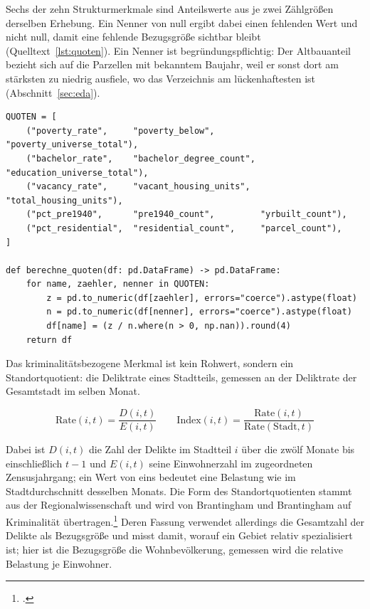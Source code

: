 Sechs der zehn Strukturmerkmale sind Anteilswerte aus je zwei Zählgrößen
derselben Erhebung. Ein Nenner von null ergibt dabei einen fehlenden Wert und
nicht null, damit eine fehlende Bezugsgröße sichtbar bleibt
(Quelltext~\ref{lst:quoten}). Ein Nenner ist begründungspflichtig: Der
Altbauanteil bezieht sich auf die Parzellen mit bekanntem Baujahr, weil er
sonst dort am stärksten zu niedrig ausfiele, wo das Verzeichnis am
lückenhaftesten ist (Abschnitt~\ref{sec:eda}).

\begin{lstlisting}[style=pythonstil,
  label={lst:quoten},
  caption={Anteilswerte aus Zählvariablen
           (\texttt{prep/s1\_daten.py}, Z.~559--584, gekürzt)}]
QUOTEN = [
    ("poverty_rate",     "poverty_below",         "poverty_universe_total"),
    ("bachelor_rate",    "bachelor_degree_count", "education_universe_total"),
    ("vacancy_rate",     "vacant_housing_units",  "total_housing_units"),
    ("pct_pre1940",      "pre1940_count",         "yrbuilt_count"),
    ("pct_residential",  "residential_count",     "parcel_count"),
]

def berechne_quoten(df: pd.DataFrame) -> pd.DataFrame:
    for name, zaehler, nenner in QUOTEN:
        z = pd.to_numeric(df[zaehler], errors="coerce").astype(float)
        n = pd.to_numeric(df[nenner], errors="coerce").astype(float)
        df[name] = (z / n.where(n > 0, np.nan)).round(4)
    return df
\end{lstlisting}

Das kriminalitätsbezogene Merkmal ist kein Rohwert, sondern ein
Standortquotient: die Deliktrate eines Stadtteils, gemessen an der Deliktrate
der Gesamtstadt im selben Monat.

\begin{equation*}
    \mathrm{Rate}(i,t) = \frac{D(i,t)}{E(i,t)}
    \qquad
    \mathrm{Index}(i,t) = \frac{\mathrm{Rate}(i,t)}{\mathrm{Rate}(\mathrm{Stadt},t)}
\end{equation*}

Dabei ist $D(i,t)$ die Zahl der Delikte im Stadtteil $i$ über die zwölf Monate
bis einschließlich $t-1$ und $E(i,t)$ seine Einwohnerzahl im zugeordneten
Zensusjahrgang; ein Wert von eins bedeutet eine Belastung wie im
Stadtdurchschnitt desselben Monats. Die Form des Standortquotienten stammt aus
der Regionalwissenschaft und wird von Brantingham und Brantingham auf
Kriminalität übertragen.\footcite[268-269]{Brantingham1997} Deren Fassung
verwendet allerdings die Gesamtzahl der Delikte als Bezugsgröße und misst
damit, worauf ein Gebiet relativ spezialisiert ist; hier ist die Bezugsgröße
die Wohnbevölkerung, gemessen wird die relative Belastung je Einwohner.

